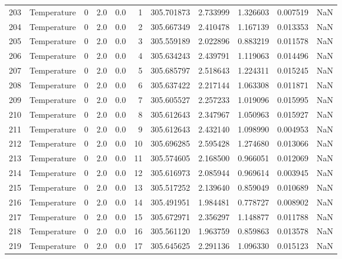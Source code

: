 \begin{tabular}{llrrrrrrrrr}
203 &  Temperature &       0 &  2.0 &  0.0 &    1 &  305.701873 &  2.733999 &  1.326603 &   0.007519 &      NaN \\
204 &  Temperature &       0 &  2.0 &  0.0 &    2 &  305.667349 &  2.410478 &  1.167139 &   0.013353 &      NaN \\
205 &  Temperature &       0 &  2.0 &  0.0 &    3 &  305.559189 &  2.022896 &  0.883219 &   0.011578 &      NaN \\
206 &  Temperature &       0 &  2.0 &  0.0 &    4 &  305.634243 &  2.439791 &  1.119063 &   0.014496 &      NaN \\
207 &  Temperature &       0 &  2.0 &  0.0 &    5 &  305.685797 &  2.518643 &  1.224311 &   0.015245 &      NaN \\
208 &  Temperature &       0 &  2.0 &  0.0 &    6 &  305.637422 &  2.217144 &  1.063308 &   0.011871 &      NaN \\
209 &  Temperature &       0 &  2.0 &  0.0 &    7 &  305.605527 &  2.257233 &  1.019096 &   0.015995 &      NaN \\
210 &  Temperature &       0 &  2.0 &  0.0 &    8 &  305.612643 &  2.347967 &  1.050963 &   0.015927 &      NaN \\
211 &  Temperature &       0 &  2.0 &  0.0 &    9 &  305.612643 &  2.432140 &  1.098990 &   0.004953 &      NaN \\
212 &  Temperature &       0 &  2.0 &  0.0 &   10 &  305.696285 &  2.595428 &  1.274680 &   0.013066 &      NaN \\
213 &  Temperature &       0 &  2.0 &  0.0 &   11 &  305.574605 &  2.168500 &  0.966051 &   0.012069 &      NaN \\
214 &  Temperature &       0 &  2.0 &  0.0 &   12 &  305.616973 &  2.085944 &  0.969614 &   0.003945 &      NaN \\
215 &  Temperature &       0 &  2.0 &  0.0 &   13 &  305.517252 &  2.139640 &  0.859049 &   0.010689 &      NaN \\
216 &  Temperature &       0 &  2.0 &  0.0 &   14 &  305.491951 &  1.984481 &  0.778727 &   0.008902 &      NaN \\
217 &  Temperature &       0 &  2.0 &  0.0 &   15 &  305.672971 &  2.356297 &  1.148877 &   0.011788 &      NaN \\
218 &  Temperature &       0 &  2.0 &  0.0 &   16 &  305.561120 &  1.963759 &  0.859863 &   0.013578 &      NaN \\
219 &  Temperature &       0 &  2.0 &  0.0 &   17 &  305.645625 &  2.291136 &  1.096330 &   0.015123 &      NaN \\

\end{tabular}

